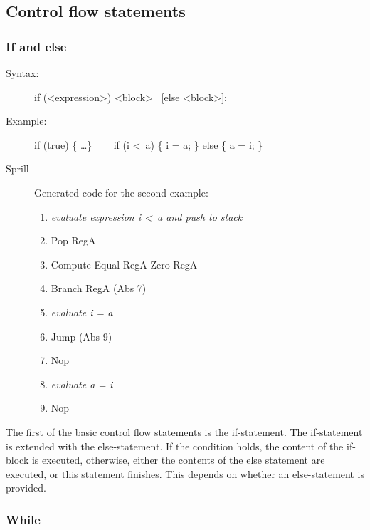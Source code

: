 \documentclass[10pt,a4paper]{report}
\begin{document}
\subsection{Control flow statements}

\subsubsection*{If and else}

\begin{description}
	\item[Syntax:] 
		if (\textless expression\textgreater ) \textless block\textgreater ~ [else \textless block\textgreater ];
	\item[Example:] 
		if (true) \{ \ldots \} ~~~
		if (i \textless ~a) \{ i = a; \} else \{ a = i; \}
	\item[Sprill] Generated code for the second example:
		\begin{enumerate}
			\item \emph{evaluate expression \emph{i \textless ~a} and push to stack}
			\item Pop RegA
			\item Compute Equal RegA Zero RegA
			\item Branch RegA (Abs 7)
			\item \emph{evaluate \emph{i = a}}
			\item Jump (Abs 9)
			\item Nop
			\item \emph{evaluate \emph{a = i}}
			\item Nop
		\end{enumerate}
\end{description} 

The first of the basic control flow statements is the if-statement. The if-statement is extended with the else-statement. If the condition holds, the content of the if-block is executed, otherwise, either the contents of the else statement are executed, or this statement finishes. This depends on whether an else-statement is provided.


\subsubsection*{While}
\end{document}
